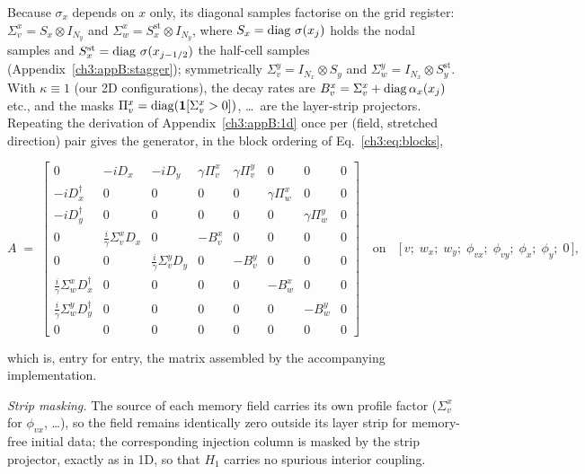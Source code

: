 Because $\sigma_x$ depends on $x$ only, its diagonal samples factorise
on the grid register:
$\Sigma_v^{x}=S_x\otimes I_{N_y}$ and
$\Sigma_w^{x}=S_x^{\mathrm{st}}\otimes I_{N_y}$, where
$S_x=\operatorname{diag}\,\sigma(x_j)$ holds the nodal samples and
$S_x^{\mathrm{st}}=\operatorname{diag}\,\sigma(x_{j-1/2})$ the half-cell samples
(Appendix~\ref{ch3:appB:stagger}); symmetrically
$\Sigma_v^{y}=I_{N_x}\otimes S_y$ and
$\Sigma_w^{y}=I_{N_x}\otimes S_y^{\mathrm{st}}$.  With $\kappa\equiv1$
(our 2D configurations), the decay rates are
$B_v^{x}=\Sigma_v^{x}+\operatorname{diag}\alpha_x(x_j)$ etc., and the masks
$\Pi_v^{x}=\operatorname{diag}(\mathbf{1}[\Sigma_v^{x}>0])$, \dots\ are the
layer-strip projectors.  Repeating the derivation of
Appendix~\ref{ch3:appB:1d} once per (field, stretched direction) pair gives
the generator, in the block ordering of Eq.~\eqref{ch3:eq:blocks},
\begin{widetext}
\begin{equation}
  A \;=\;
  \begin{bmatrix}
    0 & -iD_x & -iD_y & \gamma\Pi_v^{x} & \gamma\Pi_v^{y} & 0 & 0 & 0\\[3pt]
    -iD_x^{\dagger} & 0 & 0 & 0 & 0 & \gamma\Pi_w^{x} & 0 & 0\\[3pt]
    -iD_y^{\dagger} & 0 & 0 & 0 & 0 & 0 & \gamma\Pi_w^{y} & 0\\[3pt]
    0 & \frac{i}{\gamma}\Sigma_v^{x}D_x & 0 & -B_v^{x} & 0 & 0 & 0 & 0\\[3pt]
    0 & 0 & \frac{i}{\gamma}\Sigma_v^{y}D_y & 0 & -B_v^{y} & 0 & 0 & 0\\[3pt]
    \frac{i}{\gamma}\Sigma_w^{x}D_x^{\dagger} & 0 & 0 & 0 & 0 & -B_w^{x} & 0 & 0\\[3pt]
    \frac{i}{\gamma}\Sigma_w^{y}D_y^{\dagger} & 0 & 0 & 0 & 0 & 0 & -B_w^{y} & 0\\[3pt]
    0 & 0 & 0 & 0 & 0 & 0 & 0 & 0
  \end{bmatrix}
  \quad\text{on}\quad
  \bigl[\,v;\; w_x;\; w_y;\; \phi_{vx};\; \phi_{vy};\;
        \phi_{x};\; \phi_{y};\; 0\,\bigr],
  \label{ch3:appB:eq:gen2d}
\end{equation}
\end{widetext}
which is, entry for entry, the matrix assembled by the accompanying
implementation.

\emph{Strip masking.}  The source of each memory field carries its own
profile factor ($\Sigma_v^{x}$ for $\phi_{vx}$, \dots), so the field
remains identically zero outside its layer strip for memory-free
initial data; the corresponding injection column is masked by the strip
projector, exactly as in 1D, so that $H_1$ carries no spurious
interior coupling.

